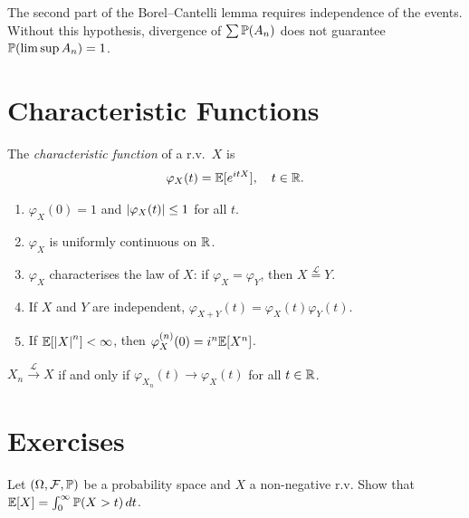\begin{warning}[title=\textbf{Independence Hypothesis}]
The second part of the Borel--Cantelli lemma requires independence of the events.
Without this hypothesis, divergence of $\sum \mathbb{P}(A_n)$ does not guarantee
$\mathbb{P}(\limsup A_n) = 1$.
\end{warning}

\section{Characteristic Functions}

\begin{definition}
The \emph{characteristic function} of a r.v.\ $X$ is
\[
  \varphi_X(t) = \mathbb{E}[e^{itX}], \quad t \in \mathbb{R}.
\]
\end{definition}

\begin{proposition}[Properties]
\begin{enumerate}
  \item $\varphi_X(0) = 1$ and $\left| \varphi_X(t) \right| \leq 1$ for all $t$.
  \item $\varphi_X$ is uniformly continuous on $\mathbb{R}$.
  \item $\varphi_X$ characterises the law of $X$: if $\varphi_X = \varphi_Y$,
    then $X \overset{\mathcal{L}}{=} Y$.
  \item If $X$ and $Y$ are independent, $\varphi_{X+Y}(t) = \varphi_X(t) \varphi_Y(t)$.
  \item If $\mathbb{E}[\left| X \right|^n] < \infty$, then $\varphi_X^{(n)}(0) = i^n \mathbb{E}[X^n]$.
\end{enumerate}
\end{proposition}

\begin{theorem}
\label{thm:levy}
$X_n \xrightarrow{\mathcal{L}} X$ if and only if $\varphi_{X_n}(t) \to \varphi_X(t)$
for all $t \in \mathbb{R}$.
\end{theorem}

\section{Exercises}

\begin{exercise}
Let $(\Omega, \mathcal{F}, \mathbb{P})$ be a probability space and $X$ a non-negative r.v.
Show that $\mathbb{E}[X] = \int_0^{\infty} \mathbb{P}(X > t) \, dt$.
\end{exercise}

